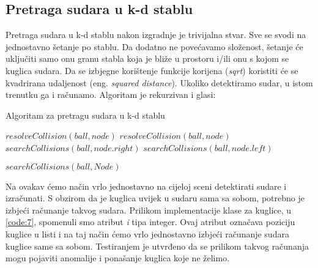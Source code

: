 \subsection{Pretraga sudara u k-d stablu}
Pretraga sudara u k-d stablu nakon izgradnje je trivijalna stvar. Sve se svodi na jednostavno šetanje po stablu. Da dodatno ne povećavamo složenost, šetanje će uključiti samo onu granu stabla koja je bliže u prostoru i/ili onu s kojom se kuglica sudara. Da se izbjegne korištenje funkcije korijena (\emph{sqrt}) koristiti će se kvadrirana udaljenost (eng. \emph{squared distance}). Ukoliko detektiramo sudar, u istom trenutku ga i računamo. Algoritam je rekurzivan i glasi:\newpage
\begin{algorithm}
	\caption{Algoritam za pretragu sudara u k-d stablu}
	\label{alg:serch_collisions_kd}
	\begin{algorithmic}	
		\State $resolveCollision(ball,node)$
		\EndIf
		\Return
		\EndIf
			$resolveCollision(ball,node)$
		\EndIf
		\State $searchCollisions(ball, node.right)$
		\State $searchCollisions(ball, node.left)$
		\EndIf
		\EndFunction
		
		\State $searchCollisions(ball,Node)$
		\EndFor
		\EndFunction

	\end{algorithmic}
\end{algorithm}
Na ovakav ćemo način vrlo jednostavno na cijeloj sceni detektirati sudare i izračunati. S obzirom da je kuglica uvijek u sudaru sama sa sobom, potrebno je izbjeći računanje takvog sudara. Prilikom implementacije klase za kuglice, u \ref{code:7}, spomenuli smo atribut \emph{i} tipa integer. Ovaj atribut označava poziciju kuglice u listi i na taj način ćemo vrlo jednostavno izbjeći računanje sudara kuglice same sa sobom. Testiranjem je utvrđeno da se prilikom takvog računanja mogu pojaviti anomalije i ponašanje kuglica koje ne želimo.\newpage
